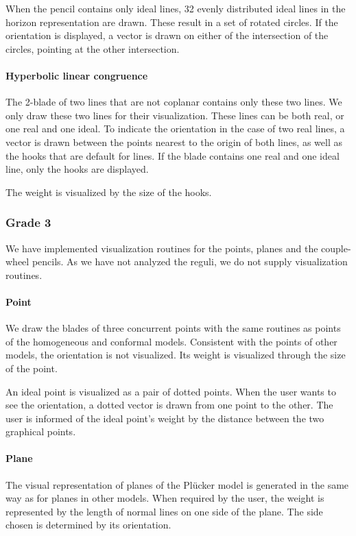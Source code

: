 When the pencil contains only ideal lines, 32 evenly distributed ideal lines in the horizon representation are drawn.  These result in a set of rotated circles.  If the orientation is displayed, a vector is drawn on either of the intersection of the circles, pointing at the other intersection.

\paragraph{Hyperbolic linear congruence}
The 2-blade of two lines that are not coplanar contains only these two lines.  We only draw these two lines for their visualization.  These lines can be both real, or one real and one ideal.  To indicate the orientation in the case of two real lines, a vector is drawn between the points nearest to the origin of both lines, as well as the hooks that are default for lines.  If the blade contains one real and one ideal line, only the hooks are displayed.  

The weight is visualized by the size of the hooks.


\subsubsection{Grade 3}
We have implemented visualization routines for the points, planes and the couple-wheel pencils.  As we have not analyzed the reguli, we do not supply visualization routines.

\paragraph{Point} 
We draw the blades of three concurrent points with the same routines as points of the homogeneous and conformal models.  Consistent with the points of other models, the orientation is not visualized.  Its weight is visualized through the size of the point.

An ideal point is visualized as a pair of dotted points.  When the user wants to see the orientation, a dotted vector is drawn from one point to the other.  The user is informed of the ideal point's weight by the distance between the two graphical points.

\paragraph{Plane} 
The visual representation of planes of the Pl\"ucker model is generated in the same way as for planes in other models.  When required by the user, the weight is represented by the length of normal lines on one side of the plane.  The side chosen is determined by its orientation. 

